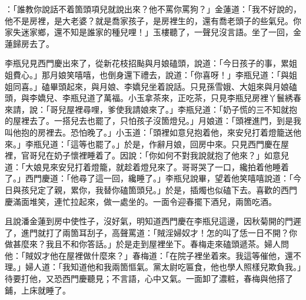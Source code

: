 ：「誰教你說話不着箇頭項兒就說出來？他不罵你罵狗？」金蓮道：「我不好說的，他不是房裡，是大老婆？就是喬家孩子，是房裡生的，還有喬老頭子的些氣兒。你家失迷家鄉，還不知是誰家的種兒哩！」玉樓聽了，一聲兒沒言語。坐了一回，金蓮歸房去了。

李瓶兒見西門慶出來了，從新花枝招颭與月娘磕頭，說道：「今日孩子的事，累姐姐費心。」{}那月娘笑嘻嘻，也倒身還下禮去，說道：「你喜呀！」李瓶兒道：「與姐姐同喜。」磕畢頭起來，與月娘、李嬌兒坐着說話。只見孫雪娥、大姐來與月娘磕頭，與李嬌兒、李瓶兒道了萬福。小玉拿茶來，正吃茶，只見李瓶兒房裡丫鬟綉春來請，說：「哥兒屋裡尋哩，爹使我請娘來了。」李瓶兒道：「奶子慌的三不知就抱的屋裡去了。一搭兒去也罷了，只怕孩子沒箇燈兒。」月娘道：「頭裡進門，到是我叫他抱的房裡去。恐怕晚了。」小玉道：「頭裡如意兒抱着他，來安兒打着燈籠送他來。」李瓶兒道：「這等也罷了。」於是，作辭月娘，回房中來。只見西門慶在屋裡，官哥兒在奶子懷裡睡着了。因說：「你如何不對我說就抱了他來？」如意兒道：「大娘見來安兒打着燈籠，就趁着燈兒來了。哥哥哭了一口，纔拍着他睡着了。」西門慶道：「他尋了這一回，纔睡了。」李瓶兒說畢，望着他笑嘻嘻說道：「今日與孩兒定了親，累你，我替你磕箇頭兒。」於是，插燭也似磕下去。喜歡的西門慶滿面堆笑，連忙拉起來，做一處坐的。一面令迎春擺下酒兒，兩箇吃酒。

且說潘金蓮到房中使性子，沒好氣，明知道西門慶在李瓶兒這邊，因秋菊開的門遲了，進門就打了兩箇耳刮子，高聲罵道：「賊淫婦奴才！怎的叫了恁一日不開？你做甚麼來？我且不和你答話。」於是走到屋裡坐下。春梅走來磕頭遞茶。婦人問他：「賊奴才他在屋裡做什麼來？」春梅道：「在院子裡坐着來。我這等催他，還不理。」婦人道：「我知道他和我兩箇慪氣。黨太尉吃匾食，他也學人照樣兒欺負我。」待要打他，又恐西門慶聽見；不言語，心中又氣。{}一面卸了濃粧，春梅與他搭了鋪，上床就睡了。

